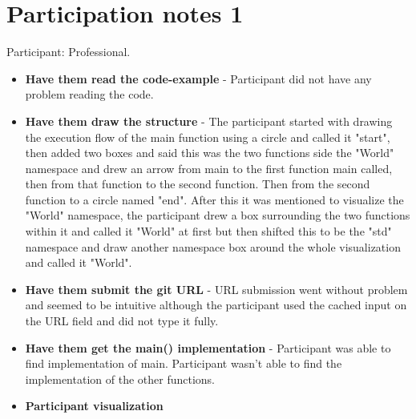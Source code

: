 \section{Participation notes 1}
Participant: Professional.

\begin{itemize}
    \item \textbf{Have them read the code-example} -  Participant did not have any problem reading the code.
    \item \textbf{Have them draw the structure} - The participant started with drawing the execution flow of the main function using a circle and called it "start", then added two boxes and said this was the two functions side the "World" namespace and drew an arrow from main to the first function main called, then from that function to the second function. Then from the second function to a circle named "end". After this it was mentioned to visualize the "World" namespace, the participant drew a box surrounding the two functions within it and called it "World" at first but then shifted this to be the "std" namespace and draw another namespace box around the whole visualization and called it "World".
    \item \textbf{Have them submit the git URL} - URL submission went without problem and seemed to be intuitive although the participant used the cached input on the URL field and did not type it fully.
    \item \textbf{Have them get the main() implementation} - Participant was able to find implementation of main. Participant wasn't able to find the implementation of the other functions.
    \item \textbf{Participant visualization} 
\end{itemize}{}
